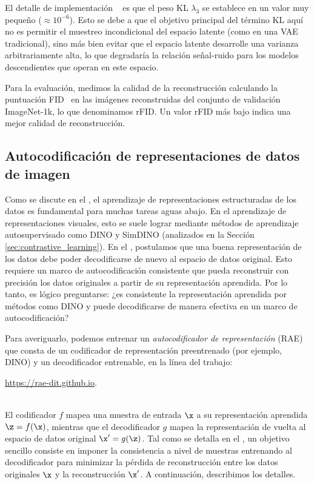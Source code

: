 \documentclass[../../book-main_es.tex]{subfiles}
\begin{document}
El detalle de implementación ~\citep{rombach2022high} es que el peso KL $\lambda_3$ se establece 
en un valor muy pequeño ($\approx 10^{-6}$). Esto se debe a que el objetivo principal del término KL 
aquí no es permitir el muestreo incondicional del espacio latente (como en una VAE tradicional), sino 
más bien evitar que el espacio latente desarrolle una varianza arbitrariamente alta, lo que degradaría 
la relación señal-ruido para los modelos descendientes que operan en este espacio.

Para la evaluación, medimos la calidad de la reconstrucción calculando la puntuación 
FID~\citep{heusel2017gans} en las imágenes reconstruidas del conjunto de validación ImageNet-1k, 
lo que denominamos rFID. Un valor rFID más bajo indica una mejor calidad de reconstrucción.

\subsection{Autocodificación de representaciones de datos de imagen}
\label{sec:RAE-implement}

\newcommand{\gc}[1]{\textcolor{deemph}{#1}}
\newcommand{\tablestyle}[2]{\setlength{\tabcolsep}{#1}\renewcommand{\arraystretch}{#2}\centering\scriptsize}

Como se discute en el , el aprendizaje de
representaciones estructuradas de los datos es fundamental para muchas tareas aguas abajo. En
el aprendizaje de representaciones visuales, esto se suele lograr mediante
métodos de aprendizaje autosupervisado como DINO
\cite{caron2021emerging} y SimDINO (analizados en la Sección
\ref{sec:contrastive_learning}). En el
, postulamos
que una buena representación de los datos debe poder decodificarse de nuevo 
al espacio de datos original. Esto requiere un marco de autocodificación
consistente que pueda reconstruir con precisión los datos originales
a partir de su representación aprendida. Por lo tanto, es lógico preguntarse: ¿es
consistente la representación aprendida por métodos como DINO y puede
decodificarse de manera efectiva en un marco de autocodificación?

Para averiguarlo, podemos entrenar un \textit{autocodificador de representación}
(RAE) que consta de un codificador de representación preentrenado (por ejemplo,
DINO) y un decodificador entrenable, en la línea del trabajo:\\
\centerline{\url{https://rae-dit.github.io}.}\\
El codificador $f$ mapea una muestra de entrada
$\x$ a su representación aprendida $\z = f(\x)$, mientras que el decodificador
$g$ mapea la representación de vuelta al espacio de datos original
$\x'=g(\z)$. Tal como se detalla en el , un objetivo sencillo
consiste en imponer la consistencia a nivel de muestras entrenando al
decodificador para minimizar la pérdida de reconstrucción entre los datos originales
$\x$ y la reconstrucción $\x'$. A continuación, describimos los detalles.
\end{document}
